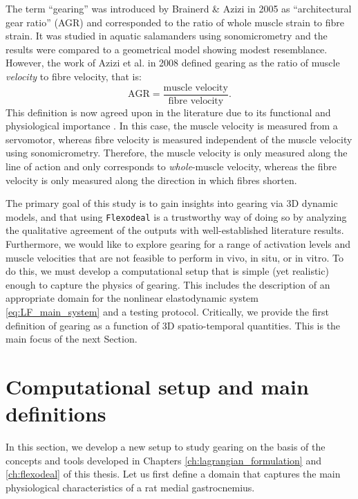 \documentclass{sfuthesis}
\numberwithin{equation}{section}
\numberwithin{figure}{chapter}
\numberwithin{table}{chapter}
\theoremstyle{definition}
\begin{document}
The term ``gearing'' was introduced by Brainerd \& Azizi \cite{BrainerdAzizi2005} in 2005 as ``architectural gear ratio'' (AGR) and corresponded to the ratio of whole muscle strain to fibre strain. It was studied in aquatic salamanders using sonomicrometry and the results were compared to a geometrical model showing modest resemblance. However, the work of Azizi et al. \cite{Azizi2008VariableGearing} in 2008 defined gearing as the ratio of muscle \textit{velocity} to fibre velocity, that is:
\begin{equation} \label{eq:def_gearing_azizi}
    \mathrm{AGR} = \dfrac{\text{muscle velocity}}{\text{fibre velocity}}.
\end{equation} 
This definition is now agreed upon in the literature due to its functional and physiological importance \cite{PintoEtAl2023Nomenclature}. In this case, the muscle velocity is measured from a servomotor, whereas fibre velocity is measured independent of the muscle velocity using sonomicrometry. Therefore, the muscle velocity is only measured along the line of action and only corresponds to \textit{whole}-muscle velocity, whereas the fibre velocity is only measured along the direction in which fibres shorten.

The primary goal of this study is to gain insights into gearing via 3D dynamic models, and that using \texttt{Flexodeal} is a trustworthy way of doing so by analyzing the qualitative agreement of the outputs with well-established literature results. Furthermore, we would like to explore gearing for a range of activation levels and muscle velocities that are not feasible to perform in vivo, in situ, or in vitro. To do this, we must develop a computational setup that is simple (yet realistic) enough to capture the physics of gearing. This includes the description of an appropriate domain for the nonlinear elastodynamic system \eqref{eq:LF_main_system} and a testing protocol. Critically, we provide the first definition of gearing as a function of 3D spatio-temporal quantities. This is the main focus of the next Section.

\section{Computational setup and main definitions} \label{sec:gearing_setup}

In this section, we develop a new setup to study gearing on the basis of the concepts and tools developed in Chapters \ref{ch:lagrangian_formulation} and \ref{ch:flexodeal} of this thesis. Let us first define a domain that captures the main physiological characteristics of a rat medial gastrocnemius.
\end{document}

